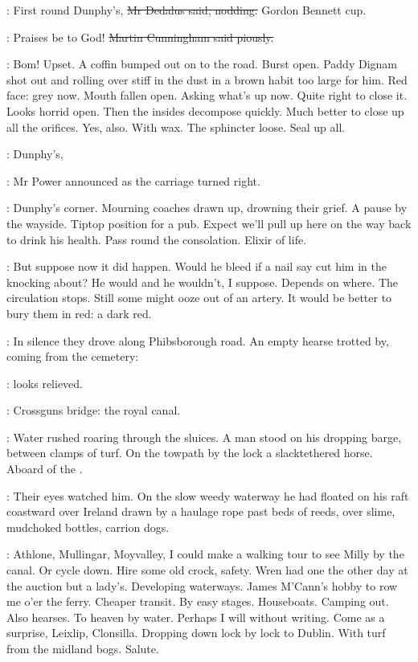 \simon:
First round Dunphy's,
\sout{Mr Dedalus said, nodding.}
Gordon Bennett cup.

\cunningham:
Praises be to God!
\sout{Martin Cunningham said piously.}

\BloomInt:
Bom!
Upset.
A coffin bumped out on to the road.
Burst open.
Paddy Dignam shot out and rolling over stiff in the dust
in a brown habit too large for him.
Red face:
grey now.
Mouth fallen open.
Asking what's up now.
Quite right to close it.
Looks horrid open.
Then the insides decompose quickly.
Much better to close up all the orifices.
Yes, also.
With wax.
The sphincter loose.
Seal up all.

\power:
Dunphy's,

:
Mr Power announced
as the carriage turned right.

\BloomInt:
Dunphy's corner.
Mourning coaches drawn up, drowning their grief.
A pause by the wayside.
Tiptop position for a pub.
Expect we'll pull up here on the way back to drink his health.
Pass round the consolation.
Elixir of life.

\BloomInt:
But suppose now it did happen.
Would he bleed if a nail say cut him in the knocking about?
He would and he wouldn't, I suppose.
Depends on where.
The circulation stops.
Still some might ooze out of an artery.
It would be better to bury them in red:
a dark red.

:
In silence they drove along Phibsborough road.
An empty hearse trotted by, coming from the cemetery:

\BloomInt:
looks relieved.

:
Crossguns bridge:
the royal canal.

:
Water rushed roaring through the sluices.
A man stood on his
dropping barge, between clamps of turf.
On the towpath by the lock
a slacktethered horse.
Aboard of the .

:
Their eyes watched him.
On the slow weedy waterway
he had floated on his raft coastward over Ireland
drawn by a haulage rope
past beds of reeds,
over slime, mudchoked bottles, carrion dogs.

\BloomInt:
Athlone, Mullingar, Moyvalley,
I could make a walking tour to see Milly by the canal.
Or cycle down.
Hire some old crock, safety.
Wren had one the other day at the auction but a lady's.
Developing waterways.
James M'Cann's hobby to row me o'er the ferry.
Cheaper transit.
By easy stages.
Houseboats.
Camping out.
Also hearses.
To heaven by water.
Perhaps I will without writing.
Come as a surprise, Leixlip, Clonsilla.
Dropping down lock by lock to Dublin.
With turf from the midland bogs.
Salute.

